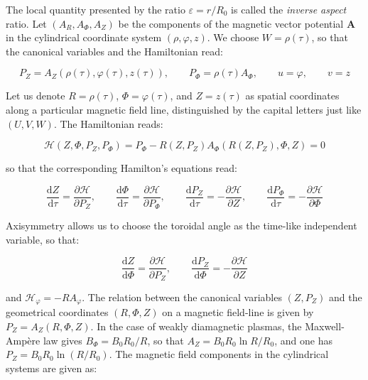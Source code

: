The local quantity presented by the ratio $\varepsilon=r/R_0$ is called the \textit{inverse aspect} ratio. Let $(A_R, A_\Phi, A_Z)$ be the components of the magnetic vector potential $\mathbf{A}$ in the cylindrical coordinate system $(\rho,\varphi,z)$. We choose $W=\rho(\tau)$, so that the canonical variables and the Hamiltonian read:

\begin{equation}
    P_Z=A_Z(\rho(\tau),\varphi(\tau), z(\tau)),\qquad P_\Phi=\rho(\tau)A_\Phi,\qquad u=\varphi,\qquad v=z
\end{equation}

Let us denote $R=\rho(\tau)$, $\Phi=\varphi(\tau)$, and $Z=z(\tau)$ as spatial coordinates along a particular magnetic field line, distinguished by the capital letters just like $(U,V,W)$. The Hamiltonian reads:

\begin{equation}
    \mathcal{H}(Z,\Phi,P_Z,P_\Phi)=P_\Phi-R(Z,P_Z)A_\Phi(R(Z,P_Z),\Phi,Z)=0
\end{equation}

so that the corresponding Hamilton's equations read:

\begin{equation}
    \frac{\mathrm{d}Z}{\mathrm{d}\tau}=\frac{\partial\mathcal{H}}{\partial P_Z},\qquad\frac{\mathrm{d}\Phi}{\mathrm{d}\tau}=\frac{\partial\mathcal{H}}{\partial P_\Phi},\qquad\frac{\mathrm{d}P_Z}{\mathrm{d}\tau}=-\frac{\partial\mathcal{H}}{\partial Z},\qquad\frac{\mathrm{d}P_\Phi}{\mathrm{d}\tau}=-\frac{\partial\mathcal{H}}{\partial\Phi}
\end{equation}

Axisymmetry allows us to choose the toroidal angle as the time-like independent variable, so that:

\begin{equation}
    \label{eq-5-200}
    \frac{\mathrm{d}Z}{\mathrm{d}\Phi}=\frac{\partial\mathcal{H}}{\partial P_Z},\qquad\frac{\mathrm{d}P_Z}{\mathrm{d}\Phi}=-\frac{\partial\mathcal{H}}{\partial Z}
\end{equation}

and $\mathcal{H}_\varphi=-RA_\varphi$. The relation between the canonical variables $(Z, P_Z)$ and the geometrical coordinates $(R, \Phi, Z)$ on a magnetic field-line is given by $P_Z=A_Z(R, \Phi, Z)$. In the case of weakly diamagnetic plasmas, the Maxwell-Ampère law gives $B_\Phi=B_0R_0/R$, so that $A_Z=B_0R_0\ln{R/R_0}$, and one has $P_Z=B_0R_0\ln{({R}/{R_0})}$. The magnetic field components in the cylindrical systems are given as:


